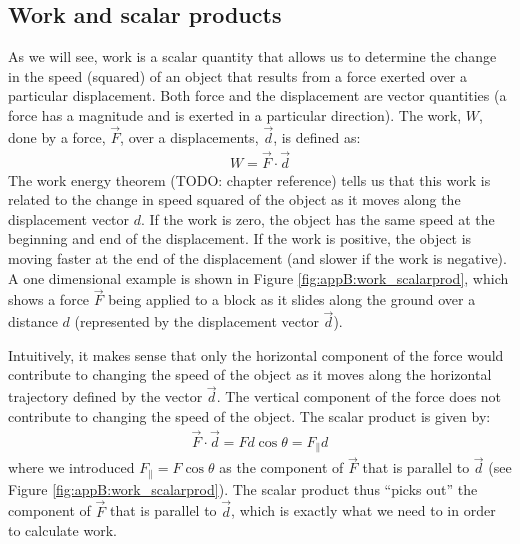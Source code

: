 \subsection{Work and scalar products}
As we will see, work is a scalar quantity that allows us to determine the change in the speed (squared) of an object that results from a force exerted over a particular displacement. Both force and the displacement are vector quantities (a force has a magnitude and is exerted in a particular direction). The work, $W$, done by a force, $\vec F$, over a displacements, $\vec d$, is defined as:
\begin{align*}
W = \vec F \cdot \vec d
\end{align*}
The work energy theorem (TODO: chapter reference) tells us that this work is related to the change in speed squared of the object as it moves along the displacement vector $d$. If the work is zero, the object has the same speed at the beginning and end of the displacement. If the work is positive, the object is moving faster at the end of the displacement (and slower if the work is negative). A one dimensional example is shown in Figure \ref{fig:appB:work_scalarprod}, which shows a force $\vec F$ being applied to a block as it slides along the ground over a distance $d$ (represented by the displacement vector $\vec d$).  


Intuitively, it makes sense that only the horizontal component of the force would contribute to changing the speed of the object as it moves along the horizontal trajectory defined by the vector $\vec d$. The vertical component of the force does not contribute to changing the speed of the object. The scalar product is given by:
\begin{align*}
\vec F \cdot \vec d = Fd\cos\theta = F_{\parallel}d
\end{align*}
where we introduced $F_{\parallel} = F\cos\theta$ as the component of $\vec F$ that is parallel to $\vec d$ (see Figure \ref{fig:appB:work_scalarprod}). The scalar product thus ``picks out'' the component of $\vec F$ that is parallel to $\vec d$, which is exactly what we need to in order to calculate work. 

